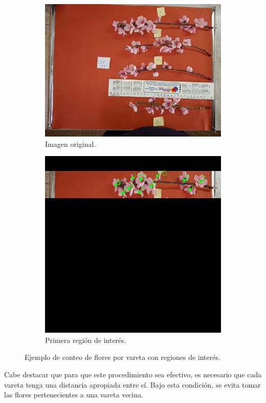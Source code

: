\begin{figure}[ht]
     \centering
     \begin{subfigure}[b]{0.5\textwidth}
         \centering
         \includegraphics[scale=0.13]{./Figures/original.jpeg}
         \caption{Imagen original.}
         \label{fig:1de34}
     \end{subfigure}
     \hfill
     \begin{subfigure}[b]{0.4\textwidth}
         \centering
         \includegraphics[scale=0.23]{./Figures/1stCount.jpeg}
         \caption{Primera región de interés.}
         \label{fig:2de34}
     \end{subfigure}
        \caption{Ejemplo de conteo de flores por vareta con regiones de interés.}
        \label{fig:regionInte}
\end{figure}
\newpage
Cabe destacar que para que este procedimiento sea efectivo, es necesario que cada vareta tenga una distancia apropiada entre sí. Bajo esta condición, se evita tomar las flores pertenecientes a una vareta vecina. 


